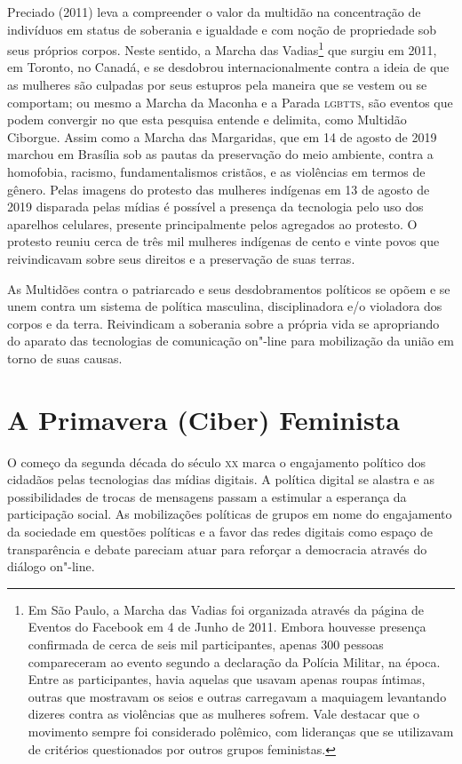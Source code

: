 Preciado (2011) leva a compreender o valor da multidão na concentração
de indivíduos em status de soberania e igualdade e com noção de
propriedade sob seus próprios corpos. Neste sentido, a Marcha das
Vadias\footnote{Em São Paulo, a Marcha das Vadias foi organizada através
  da página de Eventos do Facebook em 4 de Junho de 2011. Embora
  houvesse presença confirmada de cerca de seis mil participantes,
  apenas 300 pessoas compareceram ao evento segundo a declaração da
  Polícia Militar, na época. Entre as participantes, havia aquelas que
  usavam apenas roupas íntimas, outras que mostravam os seios e outras
  carregavam a maquiagem levantando dizeres contra as violências que as
  mulheres sofrem. Vale destacar que o movimento sempre foi considerado
  polêmico, com lideranças que se utilizavam de critérios questionados
  por outros grupos feministas.} que surgiu em 2011, em Toronto, no
Canadá, e se desdobrou internacionalmente contra a ideia de que as
mulheres são culpadas por seus estupros pela maneira que se vestem ou se
comportam; ou mesmo a Marcha da Maconha e a Parada \textsc{lgbtts}, são eventos
que podem convergir no que esta pesquisa entende e delimita, como
Multidão Ciborgue. Assim como a Marcha das Margaridas, que em 14 de
agosto de 2019 marchou em Brasília sob as pautas da preservação do meio
ambiente, contra a homofobia, racismo, fundamentalismos cristãos, e as
violências em termos de gênero. Pelas imagens do protesto das mulheres
indígenas em 13 de agosto de 2019 disparada pelas mídias é possível a
presença da tecnologia pelo uso dos aparelhos celulares, presente
principalmente pelos agregados ao protesto. O protesto reuniu cerca de
três mil mulheres indígenas de cento e vinte povos que reivindicavam
sobre seus direitos e a preservação de suas terras.

As Multidões contra o patriarcado e seus desdobramentos políticos se
opõem e se unem contra um sistema de política masculina, disciplinadora
e/o violadora dos corpos e da terra. Reivindicam a soberania sobre a
própria vida se apropriando do aparato das tecnologias de comunicação
on"-line para mobilização da união em torno de suas causas.

\section{A Primavera (Ciber) Feminista}

O começo da segunda década do século \textsc{xx} marca o engajamento político dos
cidadãos pelas tecnologias das mídias digitais. A política digital se
alastra e as possibilidades de trocas de mensagens passam a estimular a
esperança da participação social. As mobilizações políticas de grupos em
nome do engajamento da sociedade em questões políticas e a favor das
redes digitais como espaço de transparência e debate pareciam atuar para
reforçar a democracia através do diálogo on"-line.

